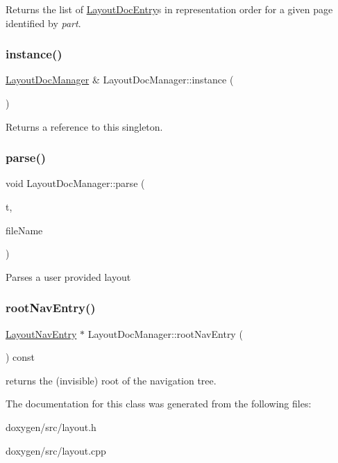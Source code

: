 Returns the list of \mbox{\hyperlink{struct_layout_doc_entry}{Layout\+Doc\+Entry}}\textquotesingle{}s in representation order for a given page identified by {\itshape part}. \mbox{\label{class_layout_doc_manager_a87bc2288833b8769bd03e47c58fbba6a}} 
\subsubsection{\texorpdfstring{instance()}{instance()}}
{\footnotesize\ttfamily \mbox{\hyperlink{class_layout_doc_manager}{Layout\+Doc\+Manager}} \& Layout\+Doc\+Manager\+::instance (\begin{DoxyParamCaption}{ }\end{DoxyParamCaption})\hspace{0.3cm}{\ttfamily [static]}}

Returns a reference to this singleton. \mbox{\label{class_layout_doc_manager_ade92fd2ccfa31a7bd8b152848d224053}} 
\subsubsection{\texorpdfstring{parse()}{parse()}}
{\footnotesize\ttfamily void Layout\+Doc\+Manager\+::parse (\begin{DoxyParamCaption}\item[{\mbox{\hyperlink{class_q_text_stream}{Q\+Text\+Stream}} \&}]{t,  }\item[{const char $\ast$}]{file\+Name }\end{DoxyParamCaption})}

Parses a user provided layout \mbox{\label{class_layout_doc_manager_ad70cfcbfc25b8f303a59cd8f76c61465}} 
\subsubsection{\texorpdfstring{rootNavEntry()}{rootNavEntry()}}
{\footnotesize\ttfamily \mbox{\hyperlink{struct_layout_nav_entry}{Layout\+Nav\+Entry}} $\ast$ Layout\+Doc\+Manager\+::root\+Nav\+Entry (\begin{DoxyParamCaption}{ }\end{DoxyParamCaption}) const}

returns the (invisible) root of the navigation tree. 

The documentation for this class was generated from the following files\+:\begin{DoxyCompactItemize}
\item 
doxygen/src/layout.\+h\item 
doxygen/src/layout.\+cpp\end{DoxyCompactItemize}

